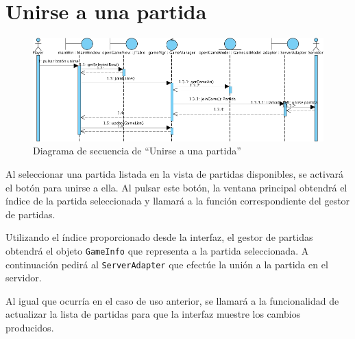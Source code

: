 \section{Unirse a una partida}

\begin{figure}[ht]
\centering
\includegraphics[scale=0.6]{img/ch03devel-joingame.png}
\caption{Diagrama de secuencia de ``Unirse a una partida''}
\end{figure}

Al seleccionar una partida listada en la vista de partidas disponibles, se
activará el botón para unirse a ella. Al pulsar este botón, la ventana
principal obtendrá el índice de la partida seleccionada y llamará a la función
correspondiente del gestor de partidas.

Utilizando el índice proporcionado desde la interfaz, el gestor de partidas
obtendrá el objeto \texttt{GameInfo} que representa a la partida seleccionada.
A continuación pedirá al \texttt{ServerAdapter} que efectúe la unión a la
partida en el servidor.

Al igual que ocurría en el caso de uso anterior, se llamará a la funcionalidad
de actualizar la lista de partidas para que la interfaz muestre los cambios
producidos.
